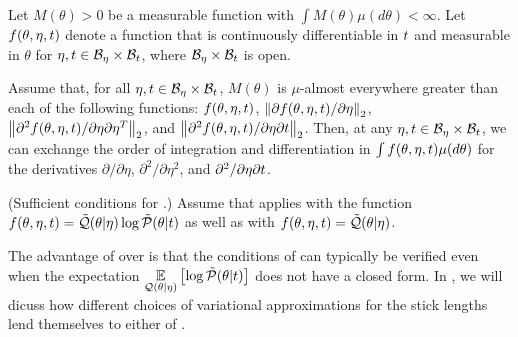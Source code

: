 %
\begin{lem}
%
Let $M(\theta) > 0$ be a measurable function with $\int M(\theta) \mu(d\theta) <
\infty$.  Let $f(\theta, \eta, t)$ denote a function that is continuously
differentiable in $t$ and measurable in $\theta$ for $\eta, t \in \mathcal{B}_\eta
\times \mathcal{B}_t$, where $\mathcal{B}_\eta \times \mathcal{B}_t$ is open.

Assume that, for all $\eta, t \in \mathcal{B}_\eta \times \mathcal{B}_t$, $M(\theta)$ is
$\mu$-almost everywhere greater than each of the following functions: $f(\theta,
\eta, t)$, $\left\Vert\partial f(\theta, \eta, t) / \partial \eta\right\Vert_2$,
$\left\Vert\partial^2 f(\theta, \eta, t) / \partial \eta \partial \eta^T\right\Vert_2$, and
$\left\Vert\partial^2 f(\theta, \eta, t) / \partial \eta \partial t\right\Vert_2$. Then, at
any $\eta, t \in \mathcal{B}_\eta \times \mathcal{B}_t$, we can exchange the order of
integration and differentiation in $\int f(\theta, \eta, t) \mu(d\theta)$ for
the derivatives $\partial / \partial \eta$, $\partial^2 / \partial \eta^2$, and
$\partial^2 / \partial \eta \partial t$.

%
\end{lem}

%
\begin{assu}
(Sufficient conditions for .)
%
Assume that  applies with the function $f(\theta, \eta,
t) = \tilde{\mathcal{Q}}(\theta \vert \eta) \log \tilde{\mathcal{P}}(\theta \vert t)$ as well as with
$f(\theta, \eta, t) = \tilde{\mathcal{Q}}(\theta \vert \eta)$.
%
\end{assu}

The advantage of  over  is
that the conditions of  can typically be verified
even when the expectation $\underset{\mathcal{Q}(\theta \vert \eta)}{\mathbb{E}}\left[\log \tilde{\mathcal{P}}(\theta
\vert t)\right]$ does not have a closed form.  In , we
will dicuss how different choices of variational approximations for the stick
lengths lend themselves to either  of
.


